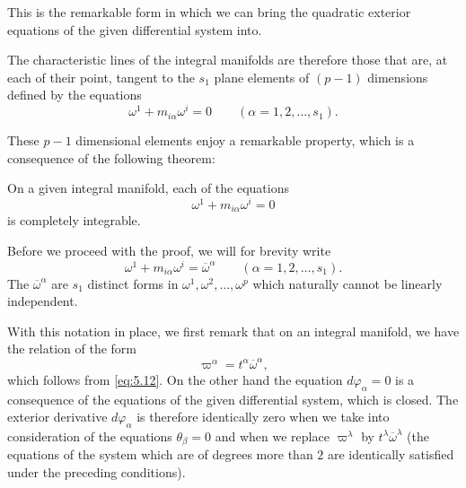 This is the remarkable form in which we can bring the quadratic exterior equations of the given differential system into.

\vspace{12pt}\fsec The characteristic lines of the integral manifolds are therefore those that are, at each of their point, tangent to the $s_{1}$ plane elements of $(p-1)$ dimensions defined by the equations
\[
\omega^{1}+m_{i\alpha}\omega^{i}=0\qquad(\alpha=1,2,\dots,s_{1}).
\]

These $p-1$ dimensional elements enjoy a remarkable property, which is a consequence of the following theorem:
\begin{thm*}
  On a given integral manifold, each of the equations
\[
\omega^{1}+m_{i\alpha}\omega^{i}=0
\]
is completely integrable.
\end{thm*}

Before we proceed with the proof, we will for brevity write
\begin{equation}
  \label{eq:5.13}
  \omega^{1}+m_{i\alpha}\omega^{i}=\overline\omega^{\alpha}\qquad(\alpha=1,2,\dots,s_{1}).
\end{equation}
The $\overline\omega^{\alpha}$ are $s_{1}$ distinct forms in $\omega^{1},\omega^{2},\dots,\omega^{p}$ which naturally cannot be linearly independent.

With this notation in place, we first remark that on an integral manifold, we have the relation of the form
\begin{equation}
  \label{eq:5.14}
  \varpi^{\alpha}=t^{\alpha}\overline\omega^{\alpha},
\end{equation}
which follows from \eqref{eq:5.12}. On the other hand the equation $d\varphi_{\alpha}=0$ is a consequence of the equations of the given differential system, which is closed. The exterior derivative $d\varphi_{\alpha}$ is therefore identically zero when we take into consideration of the equations $\theta_{\beta}=0$ and when we replace $\varpi^{\lambda}$ by $t^{\lambda}\overline\omega^{\lambda}$ (the equations of the system which are of degrees more than $2$ are identically satisfied under the preceding conditions).

